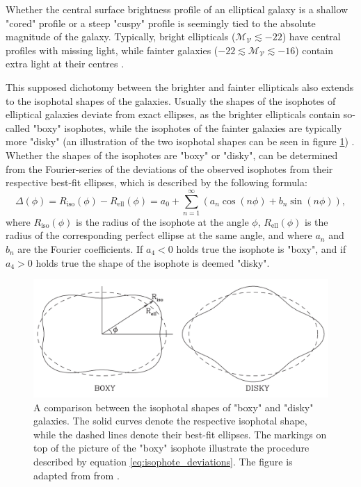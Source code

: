 \documentclass[english, oneside]{HYgradu}
\begin{document}
Whether the central surface brightness profile of an elliptical galaxy is a shallow "cored" profile or a steep "cuspy" profile is seemingly tied to the absolute magnitude of the galaxy. Typically, bright ellipticals ($\mathcal{M_V} \lesssim -22$) have central profiles with missing light, while fainter galaxies ($-22 \lesssim \mathcal{M_V} \lesssim -16$) contain extra light at their centres \citep{Kormendy2009}. 

This supposed dichotomy between the brighter and fainter ellipticals also extends to the isophotal shapes of the galaxies. Usually the shapes of the isophotes of elliptical galaxies deviate from exact ellipses, as the brighter ellipticals contain so-called "boxy" isophotes, while the isophotes of the fainter galaxies are typically more "disky" (an illustration of the two isophotal shapes can be seen in figure \ref{figure:isophotes}) \citep{GalaxyFormationAndEvo2010}. Whether the shapes of the isophotes are "boxy" or "disky", can be determined from the Fourier-series of the deviations of the observed isophotes from their respective best-fit ellipses, which is described by the following formula:
\begin{equation}
\Delta (\phi) = R_\mathrm{iso}(\phi) - R_\mathrm{ell}(\phi) = a_0 + \displaystyle\sum^\infty_{n=1} (a_n \cos(n\phi) + b_n \sin(n\phi)), \label{eq:isophote_deviations}
\end{equation}
where $R_\mathrm{iso}(\phi)$ is the radius of the isophote at the angle $\phi$, $R_\mathrm{ell}(\phi)$ is the radius of the corresponding perfect ellipse at the same angle, and where $a_n$ and $b_n$ are the Fourier coefficients. If $a_4 < 0$ holds true the isophote is "boxy", and if $a_4 > 0$ holds true the shape of the isophote is deemed "disky".

\begin{figure}
	\centering
	\includegraphics[width=\textwidth]{boxy_and_disky_GFE.png}
	\caption{A comparison between the isophotal shapes of "boxy" and "disky" galaxies. The solid curves denote the respective isophotal shape, while the dashed lines denote their best-fit ellipses. The markings on top of the picture of the "boxy" isophote illustrate the procedure described by equation \ref{eq:isophote_deviations}. The figure is adapted from from \cite{GalaxyFormationAndEvo2010}.}
	\label{figure:isophotes}
\end{figure}
\end{document}
